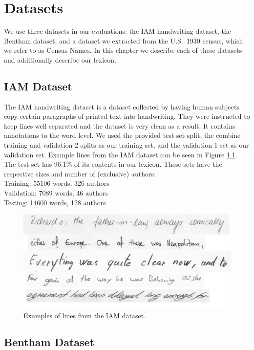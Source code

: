 \documentclass[ms,electronic,twosidetoc,letterpaper,chaptercenter,parttop,lol,lof,lot]{byumsphd}
\begin{document}
\chapter{Datasets}\label{datasets}

We use three datasets in our evaluations: the IAM handwriting dataset, the Bentham dataset, and a dataset we extracted from the U.S.~1930 census, which we refer to as Census Names. In this chapter we describe each of these datasets and additionally describe our lexicon.

\section{IAM Dataset}

The IAM handwriting dataset \cite{IAM} is a dataset collected by having human subjects copy certain paragraphs of printed text into handwriting. They were instructed to keep lines well separated and the dataset is very clean as a result. It contains annotations to the word level. We used the provided test set split, the combine training and validation 2 splits as our training set, and the validation 1 set as our validation set.
Example lines from the IAM dataset can be seen in Figure \ref{fig:IAMExamples}.
The test set has 96.1\% of its contents in our lexicon.
These sets have the respective sizes and number of (exclusive) authors:\\
\indent \indent Training: 55106 words, 326 authors\\
\indent \indent Validation: 7089 words, 46 authors\\
\indent \indent Testing: 14600 words, 128 authors

\begin{figure}
    \centering
    \includegraphics[width=.9\textwidth]{IAM_examples}
    \caption{Examples of lines from the IAM dataset.}
    \label{fig:IAMExamples}
\end{figure}

\section{Bentham Dataset}
\end{document}
